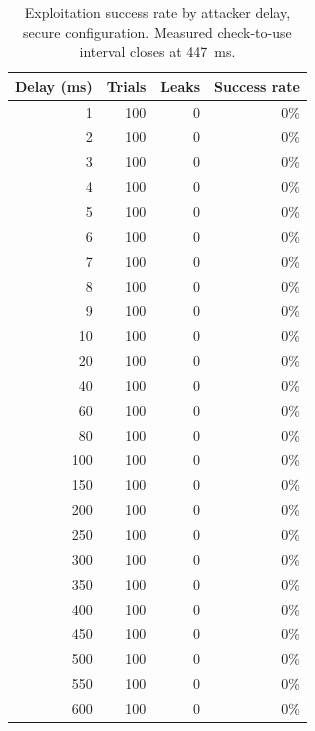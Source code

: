 \begin{table}[ht]
\centering
\begin{tabular}{rrrr}
\hline
Delay (ms) & Trials & Leaks & Success rate \\
\hline
1 & 100 & 0 & 0\% \\
2 & 100 & 0 & 0\% \\
3 & 100 & 0 & 0\% \\
4 & 100 & 0 & 0\% \\
5 & 100 & 0 & 0\% \\
6 & 100 & 0 & 0\% \\
7 & 100 & 0 & 0\% \\
8 & 100 & 0 & 0\% \\
9 & 100 & 0 & 0\% \\
10 & 100 & 0 & 0\% \\
20 & 100 & 0 & 0\% \\
40 & 100 & 0 & 0\% \\
60 & 100 & 0 & 0\% \\
80 & 100 & 0 & 0\% \\
100 & 100 & 0 & 0\% \\
150 & 100 & 0 & 0\% \\
200 & 100 & 0 & 0\% \\
250 & 100 & 0 & 0\% \\
300 & 100 & 0 & 0\% \\
350 & 100 & 0 & 0\% \\
400 & 100 & 0 & 0\% \\
450 & 100 & 0 & 0\% \\
500 & 100 & 0 & 0\% \\
550 & 100 & 0 & 0\% \\
600 & 100 & 0 & 0\% \\
\hline
\end{tabular}
\caption{Exploitation success rate by attacker delay, secure configuration. Measured check-to-use interval closes at 447~ms.}
\label{tab:success-secure}
\end{table}
